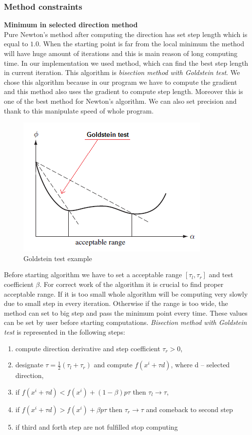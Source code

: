 \documentclass[12pt]{article}
\begin{document}
\subsubsection{Method constraints}
\textbf{Minimum in selected direction method} \\
Pure Newton's method after computing the direction has set step length which is equal to $1.0$. When the starting point is far from the local minimum the method will have huge amount of iterations and this is main reason of long computing time. In our implementation we used method, which can find the best step length in current iteration. This algorithm is \textit{bisection method with Goldstein test}. We chose this algorithm because in our program we have to compute the gradient and this method also uses the gradient to compute step length. Moreover this is one of the best method for Newton's algorithm. We can also set precision and thank to this manipulate speed of whole program.
\begin{figure}[H]
\begin{center}
\includegraphics[scale=0.9]{images/goldstein.png}
\caption{Goldstein test example \cite{mathematics}}
\label{goldstein}
\end{center}		
\end{figure}
Before starting algorithm we have to set a acceptable range $[\tau_l, \tau_r]$ and test coefficient $\beta$. For correct work of the algorithm it is crucial to find proper acceptable range. If it is too small whole algorithm will be computing very slowly due to small step in every iteration. Otherwise if the range is too wide, the method can set to big step and pass the minimum point every time. These values can be set by user before starting computations. \textit{Bisection method with Goldstein test} is represented in the following steps:
\begin{enumerate}
\item compute direction derivative and step coefficient $\tau_r > 0$,
\item designate $\tau=\frac{1}{2}(\tau_l+\tau_r)$ and compute $f(x^i+\tau d)$, where d -- selected direction,
\item if $f(x^i+\tau d)<f(x^i)+(1-\beta)p\tau$ then $\tau_l \rightarrow \tau$,
\item if $f(x^i+\tau d)>f(x^i)+\beta p\tau$ then $\tau_r \rightarrow \tau$ and comeback to second step
\item if third and forth step are not fulfilled stop computing
\end{enumerate}
\end{document}
